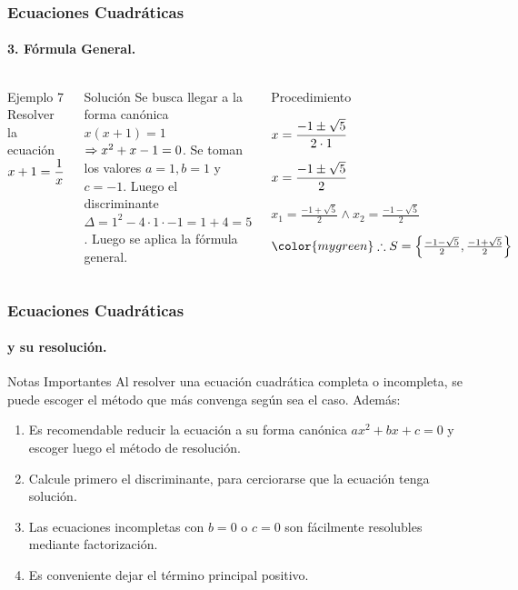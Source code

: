 \documentclass[mathserif]{beamer}
\begin{document}
\begin{frame}
\frametitle{\bf Ecuaciones Cuadráticas} 
\framesubtitle{3. Fórmula General.}

    \begin{columns}
        \begin{exampleblock}{Ejemplo 7}
        \bc
        Resolver la ecuación $\displaystyle x+1=\frac1x$
        \ec
        \end{exampleblock}
\pause
        \begin{block}{Solución}
        Se busca llegar a la forma canónica \alert<2>{$x(x+1)=1$ $\Rightarrow x^2+x-1=0$}. Se toman los valores $a=1, b=1$ y $c=-1$. Luego el discriminante $\Delta=1^2-4\cdot 1\cdot -1=1+4=5$. Luego se aplica la fórmula general.
        \end{block}
\pause
        \begin{block}{Procedimiento}
            \benu
            \item[] <4-| alert@4>$\displaystyle x=\frac{-1\pm\sqrt{5}}{2\cdot 1}$
            \item[] <5-| alert@5>$\displaystyle x=\frac{-1\pm\sqrt{5}}{2}$
            \item[] <6-| alert@6>$x_1=\frac{-1+\sqrt{5}}{2}\wedge x_2=\frac{-1-\sqrt{5}}{2}$
            \pause
            \item[] <7-| alert@7>{\bm $\color{mygreen}\tf S=\iz\frac{-1-\sqrt{5}}{2},\frac{-1+\sqrt{5}}{2}\der$}
            \eenu
            \pause
            \bc
            \ec
        \end{block}
    \end{columns}
\end{frame}

\begin{frame} 
\frametitle{\bf Ecuaciones Cuadráticas} 
\framesubtitle{y su resolución.} 

\begin{block}{Notas Importantes}
Al resolver una ecuación cuadrática completa o incompleta, se puede escoger el método que más convenga según sea el caso. Además: 

\pause
\begin{enumerate} 
\item<2-| alert@2> Es recomendable reducir la ecuación a su forma canónica $ax^2+bx+c=0$ y escoger luego el método de resolución. 
\item<3-| alert@3> Calcule primero el discriminante, para cerciorarse que la ecuación tenga solución.
\item<4-| alert@4> Las ecuaciones incompletas con $b=0$ o $c=0$ son fácilmente resolubles mediante factorización.
\item<5-| alert@5> Es conveniente dejar el término principal positivo.
\end{enumerate}
\end{block}
\end{frame}
\end{document}
